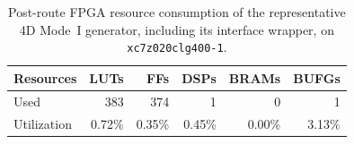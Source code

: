 \begin{table}[pos=t,width=238.25444pt]
	  	\centering
\begin{minipage}{\ifdim\linewidth>238.25444pt238.25444pt\else\linewidth\fi}

	  	\caption{Post-route FPGA resource consumption of the representative 4D Mode~I generator, including its interface wrapper, on \texttt{xc7z020clg400-1}.}
	  	\label{tab:proposed-4d-map-resource}
	  	\renewcommand{\arraystretch}{1.08}
	  	\fontsize{9}{10.5}\selectfont
	  	\setlength{\tabcolsep}{3pt}
\begin{tabular}{lrrrrr}
	  		\hline
	  		Resources & LUTs & FFs & DSPs & BRAMs & BUFGs \\
	  		\hline
	  		Used & 383 & 374 & 1 & 0 & 1 \\
	  		Utilization & 0.72\% & 0.35\% & 0.45\% & 0.00\% & 3.13\% \\
	  		\hline
	  	\end{tabular}
	  \end{minipage}
\end{table}